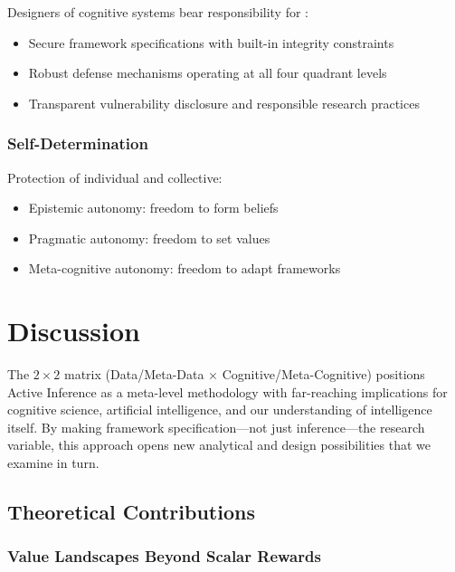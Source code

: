 \documentclass[
]{article}
\providecommand{\tightlist}{%
  \setlength{\itemsep}{0pt}\setlength{\parskip}{0pt}}
\begin{document}
Designers of cognitive systems bear responsibility for
\citep{floridi2016faultless, gabriel2020artificial}:

\begin{itemize}
\tightlist
\item
  Secure framework specifications with built-in integrity constraints
\item
  Robust defense mechanisms operating at all four quadrant levels
\item
  Transparent vulnerability disclosure and responsible research
  practices
\end{itemize}

\subsubsection{Self-Determination}\label{self-determination}

Protection of individual and collective:

\begin{itemize}
\tightlist
\item
  Epistemic autonomy: freedom to form beliefs
\item
  Pragmatic autonomy: freedom to set values
\item
  Meta-cognitive autonomy: freedom to adapt frameworks
\end{itemize}

\newpage

\section{Discussion}\label{sec:discussion}

The \(2 \times 2\) matrix (Data/Meta-Data × Cognitive/Meta-Cognitive)
positions Active Inference as a meta-level methodology with far-reaching
implications for cognitive science, artificial intelligence, and our
understanding of intelligence itself. By making framework
specification---not just inference---the research variable, this
approach opens new analytical and design possibilities that we examine
in turn.

\subsection{Theoretical
Contributions}\label{sec:theoretical_contributions}

\subsubsection{Value Landscapes Beyond Scalar
Rewards}\label{value-landscapes-beyond-scalar-rewards}
\end{document}
